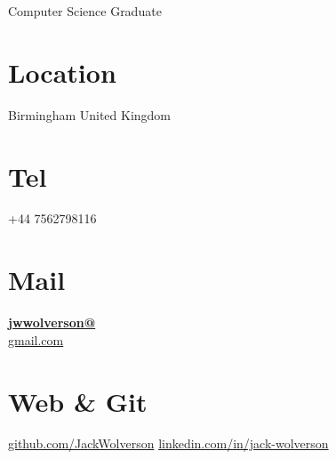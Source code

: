 \documentclass[]{friggeri-cv}
\begin{document}
      {Computer Science Graduate}
      

\begin{aside}
  \section{Location}
    Birmingham
    United Kingdom
    ~
  \section{Tel}
    +44 7562798116
    ~
  \section{Mail}
    \href{mailto:jwwolverson@gmail.com}{\textbf{jwwolverson@}\\gmail.com}
    ~
  \section{Web \& Git}
    \href{http://github.com/JackWolverson}{github.com/JackWolverson}
    \href{https://www.linkedin.com/in/jack-wolverson/}{linkedin.com/in/jack-wolverson}
    ~

\end{aside}
\end{document}
